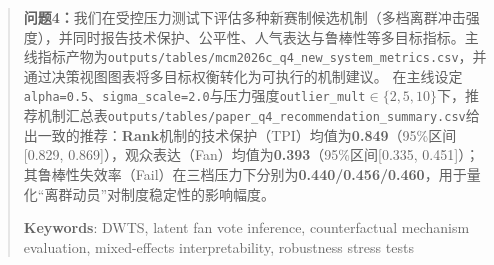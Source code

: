 \begin{abstract}
	\textbf{问题4：}我们在受控压力测试下评估多种新赛制候选机制（多档离群冲击强度），并同时报告技术保护、公平性、人气表达与鲁棒性等多目标指标。主线指标产物为\texttt{outputs/tables/mcm2026c\_q4\_new\_system\_metrics.csv}，并通过决策视图图表将多目标权衡转化为可执行的机制建议。
	在主线设定\texttt{alpha=0.5}、\texttt{sigma\_scale=2.0}与压力强度\texttt{outlier\_mult}$\in\{2,5,10\}$下，推荐机制汇总表\texttt{outputs/tables/paper\_q4\_recommendation\_summary.csv}给出一致的推荐：\textbf{Rank}机制的技术保护（TPI）均值为\textbf{0.849}（95\%区间[0.829, 0.869]），观众表达（Fan）均值为\textbf{0.393}（95\%区间[0.335, 0.451]）；其鲁棒性失效率（Fail）在三档压力下分别为\textbf{0.440/0.456/0.460}，用于量化“离群动员”对制度稳定性的影响幅度。
	
	
	
	
	
	
	
	
	\vspace{5pt}  %
	\noindent\textbf{Keywords}: DWTS, latent fan vote inference, counterfactual mechanism evaluation, mixed-effects interpretability, robustness stress tests
\end{abstract}
\maketitle  %

